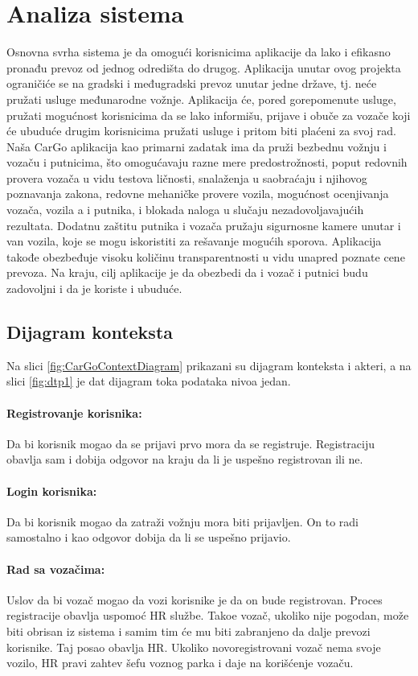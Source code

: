 \section{\bfseries Analiza sistema}

Osnovna svrha sistema je da omogući korisnicima aplikacije da lako i efikasno pronađu prevoz od jednog odredišta do drugog. Aplikacija unutar ovog projekta ograničiće se na gradski i međugradski prevoz unutar jedne države, tj. neće pružati usluge međunarodne vožnje. Aplikacija će, pored gorepomenute usluge, pružati mogućnost korisnicima da se lako informišu, prijave i obuče za vozače koji će ubuduće drugim korisnicima pružati usluge i pritom biti plaćeni za svoj rad. Naša CarGo aplikacija kao primarni zadatak ima da pruži bezbednu vožnju i vozaču i putnicima, što omogućavaju razne mere predostrožnosti, poput redovnih provera vozača u vidu testova ličnosti, snalaženja u saobraćaju i njihovog poznavanja zakona, redovne mehaničke provere vozila, mogućnost ocenjivanja vozača, vozila a i putnika, i blokada naloga u slučaju nezadovoljavajućih rezultata. Dodatnu zaštitu putnika i vozača pružaju sigurnosne kamere unutar i van vozila, koje se mogu iskoristiti za rešavanje mogućih sporova. Aplikacija takođe obezbeđuje visoku količinu transparentnosti u vidu unapred poznate cene prevoza. Na kraju, cilj aplikacije je da obezbedi da i vozač i putnici budu zadovoljni i da je koriste i ubuduće.
     
\subsection{\bfseries Dijagram konteksta}

\quad Na slici \ref{fig:CarGoContextDiagram} prikazani su dijagram konteksta i akteri, a na slici \ref{fig:dtp1} je dat dijagram toka podataka nivoa jedan.
\paragraph{Registrovanje korisnika:}
    Da bi korisnik mogao da se prijavi prvo mora da se registruje. Registraciju obavlja sam i dobija odgovor na kraju da li je uspe\v sno registrovan ili ne.
\paragraph{Login korisnika:}
    Da bi korisnik mogao da zatra\v zi vo\v znju mora biti prijavljen. On to radi samostalno i kao odgovor dobija da li se uspe\v sno prijavio.
\paragraph{Rad sa voza\v cima:}
    Uslov da bi voza\v c mogao da vozi korisnike je da on bude registrovan. Proces registracije obavlja uspomo\' c HR slu\v zbe. Tako\dj e voza\v c, ukoliko nije pogodan, mo\v ze biti obrisan iz sistema i samim tim će mu biti zabranjeno da dalje prevozi korisnike. Taj posao obavlja HR. Ukoliko novoregistrovani voza\v c nema svoje vozilo, HR pravi zahtev \v sefu voznog parka i daje na kori\v sćenje voza\v cu.
